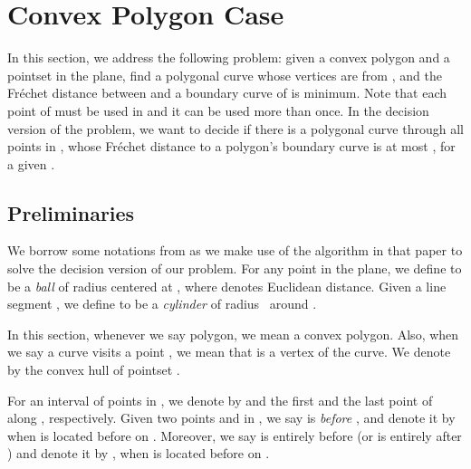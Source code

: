 \documentclass[a4paper,UKenglish]{lipics}
\newcommand{\REM}[1]{}
\newcommand{\Frechet}{Fr\'echet }
\begin{document}
\section {Convex Polygon Case}
\label{sec:SpecialCase}

In this section, we address the following problem:
given a convex polygon  and a pointset  in
the plane, 
find a polygonal curve  whose vertices are from ,
and the \Frechet distance between 
and a boundary curve of  is minimum.
Note that each point of  must be used in  and it  
can be used more than once. 
In the decision version of the problem,
we want to decide if there is a polygonal curve  through all points in  
, 
whose \Frechet distance to a polygon's boundary curve 
is at most , for a given . 





\subsection{Preliminaries}
\label{subsec:preliminaries}

We borrow some notations 
from \cite{cccg11}
as we make use of the algorithm in that paper
to solve the decision version of our problem.
For any point  in the plane,
we define 
to be a \emph{ball} of radius  centered at ,
where  denotes  Euclidean distance.
Given a line segment ,
we define 
to be a \emph{cylinder} of radius~ around .

In this section, whenever we say polygon, we mean 
a convex polygon. Also, when we 
say a curve visits a point , we mean that 
 is a vertex of the curve.
We denote by  the convex hull of pointset .

For an interval  of points in  ,
we denote by  and 
the first and the last point of  along , respectively.
Given two points  and  in , 
we say  is {\em before\/} , and denote it by  when
 is located before  on .
Moreover, 
we say  is entirely before  (or  is entirely after ) 
and denote it by , when  is located before  on .

\REM{
Consider two points 
and , . 
We say  is reachable from  (or  can reach  ), 
if a semi-feasible curve  exists 
which ends at point  and visits .
Furthermore, we say point  can directly reach  ,
if  is a reachable point and 
reaches   via edge .
We call an  edge  between points  and , 
 a {\em forward edge} when
 and  are in  and 
( or ). In addition, 
if  
and , , 
and point  reaches  via edge , 
then we call that edge a forward edge too.
We call an  edge , a {\em backward edge} if  and  are both in  and 
. 

Let  and 
 denote the start and end point of polygonal chain 
.
}
\end{document}
